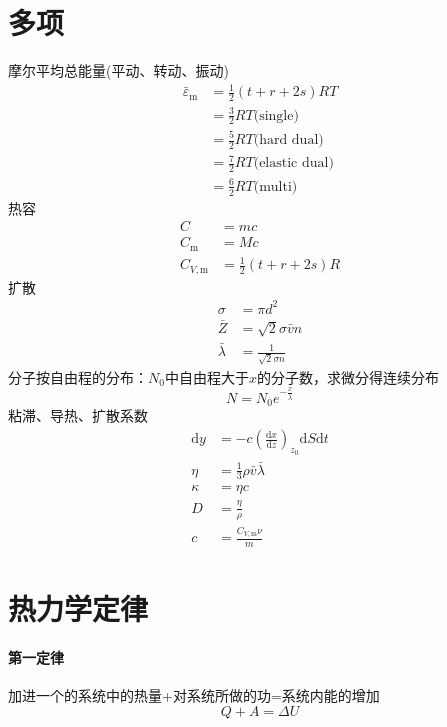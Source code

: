 \documentclass[10pt]{article}
\numberwithin{equation}{section}
\begin{document}
\begin{multicols}{3}
\begin{CJK}{UTF8}{song}
\section{多项}
摩尔平均总能量(平动、转动、振动)
\begin{align}
  {\bar{\varepsilon}}_{\textrm{m}}&=\frac{1}{2}\left(t+r+2s\right)RT \nonumber \\ \nonumber
  &=\frac{3}{2}RT\textrm{(single)} \nonumber \\&=\frac{5}{2}RT\textrm{(hard dual)} \nonumber\\
  &=\frac{7}{2}RT\textrm{(elastic dual)} \nonumber \\ &=\frac{6}{2}RT\textrm{(multi)}
\end{align}
热容
\begin{align}
  C&=mc \\
  C_{\textrm{m}}&=Mc \\
  C_{V,\textrm{m}}&=\frac{1}{2}\left(t+r+2s\right)R
\end{align}
扩散
\begin{align}
  \sigma&=\pi d^2 \\
  \bar{Z}&=\sqrt2\sigma\bar{v}n \\
  \bar{\lambda}&=\frac{1}{\sqrt2\sigma n}
\end{align}
分子按自由程的分布：$N_0$中自由程大于$x$的分子数，求微分得连续分布
\begin{equation}
  N=N_0 e^{-\frac{x}{\bar{\lambda}}}
\end{equation}
粘滞、导热、扩散系数
\begin{align}
  \textrm{d}y&=-c\left(\frac{\textrm{d}x}{\textrm{d}z}\right)_{z_0}\textrm{d}S\textrm{d}t \\
  \eta&=\frac{1}{3}\rho\bar{v}\bar{\lambda} \\
  \kappa&=\eta c\\
  D&=\frac{\eta}{\rho} \\
  c&=\frac{C_{V,\textrm{m}}\nu}{m}
\end{align}

\section{热力学定律}
\paragraph{第一定律} 加进一个的系统中的热量+对系统所做的功=系统内能的增加
\begin{equation}
  Q+A=\Delta U
\end{equation}

\end{CJK}
\end{multicols}
\end{document}
